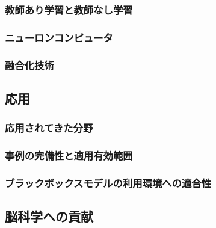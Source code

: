 \documentclass[uplatex, 11pt, a4j, dvipdfmx]{jsarticle}
\begin{document}
      \subsubsection{教師あり学習と教師なし学習}
      \subsubsection{ニューロンコンピュータ}
      \subsubsection{融合化技術}
    \subsection{応用}
      \subsubsection{応用されてきた分野}
      \subsubsection{事例の完備性と適用有効範囲}
      \subsubsection{ブラックボックスモデルの利用環境への適合性}
    \subsection{脳科学への貢献}
\end{document}
